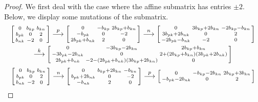 \documentclass[10pt]{article}
\theoremstyle{definition}
\theoremstyle{remark}
\numberwithin{equation}{section}
\newcommand{\0}{{\mathbf{0}}}
\begin{document}
\begin{proof}
We first deal with the case where the affine submatrix has entries $\pm2$.
Below, we display some mutations of the submatrix.
\begin{multline*}
\begin{bsmallmatrix*}
	0 & b_{kp} & b_{kn} \\
	b_{pk} & 0 & 2 \\
	b_{nk} & -2 & 0
\end{bsmallmatrix*}
\overset{p}{\longrightarrow}
\begin{bsmallmatrix*}
	0 & -b_{kp} & 2b_{kp}+b_{kn} \\
	-b_{pk} & 0 & -2 \\
	2b_{pk}+b_{nk}& 2 & 0
\end{bsmallmatrix*}
\overset{n}{\longrightarrow}
\begin{bsmallmatrix*}
	0 & 3b_{kp}+2b_{kn} & -2b_{kp}-b_{kn} \\
	3b_{pk}+2b_{nk} & 0 & 2 \\
	-2b_{pk}-b_{nk} & -2 & 0
\end{bsmallmatrix*}\\
\overset{k}{\longrightarrow}
\begin{bsmallmatrix*}
	0 & -3b_{kp}-2b_{kn} & 2b_{kp}+b_{kn} \\
	-3b_{pk}-2b_{nk} & 0 & 2+(2b_{kp}+b_{kn})(3b_{pk}+2b_{nk}) \\
	2b_{pk}+b_{nk} & -2-(2b_{pk}+b_{nk})(3b_{kp}+2b_{kn})& 0
\end{bsmallmatrix*}
\end{multline*}
\begin{multline*}
\begin{bsmallmatrix*}
	0 & b_{kp} & b_{kn} \\
	b_{pk} & 0 & 2 \\
	b_{nk} & -2 & 0
\end{bsmallmatrix*}\overset{n}{\longrightarrow}
\begin{bsmallmatrix*}
	0 & b_{kp}+2b_{kn} & -b_{kn} \\
	b_{pk}+2b_{nk} & 0 & -2 \\
	-b_{nk} & 2 & 0
\end{bsmallmatrix*}\overset{p}{\longrightarrow}
\begin{bsmallmatrix*}
	0 & -b_{kp}-2b_{kn} & 2b_{kp}+3b_{kn} \\
	-b_{pk}-2b_{nk} & 0 & 2 \\

\end{bsmallmatrix*}
\end{multline*}
\end{proof}
\end{document}
